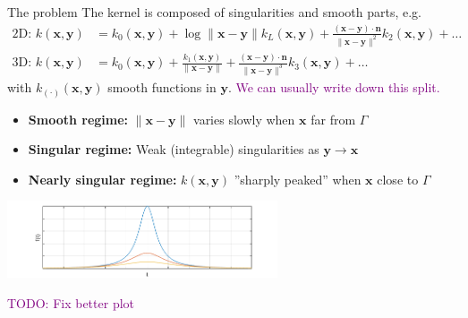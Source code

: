 \documentclass[t]{beamer}
\newcommand{\mbf}[1]{{\bm #1}}           %
\newcommand{\com}[1]{{\scriptsize \textcolor{purple}{#1}}}      %
\newcommand{\sg}{\vspace{1ex}}
\newcommand{\xx}{\mbf{x}}
\newcommand{\yy}{\mbf{y}}
\newcommand{\nn}{\mbf{n}}
\begin{document}
\begin{frame}{The problem}
  The kernel is composed of singularities and smooth parts, e.g.
  \begin{align}
    \text{2D: }
    k(\xx, \yy) &= k_0(\xx, \yy) +
                  \log\|\xx-\yy\| k_L(\xx, \yy) +
                  \frac{(\xx-\yy)\cdot\nn}{\|\xx-\yy\|^2} k_2(\xx, \yy) + \dots
    \\
    \text{3D: }
    k(\xx, \yy) &= k_0(\xx, \yy) +
                  \frac{k_1(\xx, \yy)}{\|\xx-\yy\|}  + 
                  \frac{(\xx-\yy)\cdot\nn}{\|\xx-\yy\|^3} k_3(\xx, \yy) + \dots
  \end{align}
  with $k_{(\cdot)}(\xx,\yy)$ smooth functions in $\yy$. \com{We can usually write down this split.}

  \pause
  \sg
  \begin{itemize}
  \item \textbf{Smooth regime:} $\|\xx-\yy\|$ varies slowly when $\xx$ far from $\Gamma$
  \item \textbf{Singular regime:} Weak (integrable) singularities as $\yy \to \xx$
  \item \textbf{Nearly singular regime:} $k(\xx,\yy)$ ''sharply
    peaked'' when $\xx$ close to $\Gamma$
  \end{itemize}
  \begin{center}
    \includegraphics[width=0.6\textwidth]{fig/kernel_curve}
  \end{center}
  \com{TODO: Fix better plot}
\end{frame}
\end{document}
